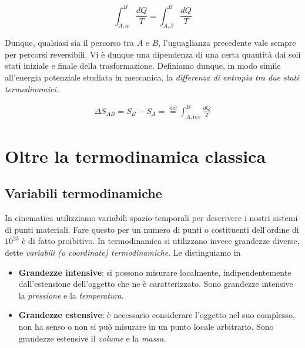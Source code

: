 \[ \int_{A,\alpha}^{B} \frac{dQ}{T} = \int_{A,\beta}^{B} \frac{dQ}{T} \]

\noindent Dunque, qualsiasi sia il percorso tra $A$ e $B$, l'uguaglianza
precedente vale sempre per percorsi reversibili. Vi è dunque una dipendenza
di una certa quantità dai soli stati iniziale e finale della trasformazione.
Definiamo dunque, in modo simile all'energia potenziale studiata in meccanica,
la \textit{differenza di entropia tra due stati termodinamici}.

\begin{align}
    \Delta S_{AB} = S_B - S_A = \stackrel{\text{def}}{=} \int_{A,\text{rev}}^{B} \frac{dQ}{T}
\end{align}


\section{Oltre la termodinamica classica}



































\subsection*{Variabili termodinamiche}
In cinematica utilizziamo variabili spazio-temporali per descrivere i nostri
sistemi di punti materiali. Fare questo per un numero di punti o costituenti
dell'ordine di $10^{23}$ è di fatto proibitivo. In termodinamica si utilizzano
invece grandezze diverse, dette \textit{variabili (o coordinate) termodinamiche}.
Le distinguiamo in

\begin{itemize}
    \item \textbf{Grandezze intensive}: si possono misurare localmente,
    indipendentemente dall'estensione dell'oggetto che ne è caratterizzato.
    Sono grandezze intensive la \textit{pressione} e la \textit{temperatura}.

    \item \textbf{Grandezze estensive}: è necessario considerare l'oggetto nel
    suo complesso, non ha senso o non si può misurare in un punto locale arbitrario.
    Sono grandezze estensive il \textit{volume} e la \textit{massa}.
\end{itemize}

